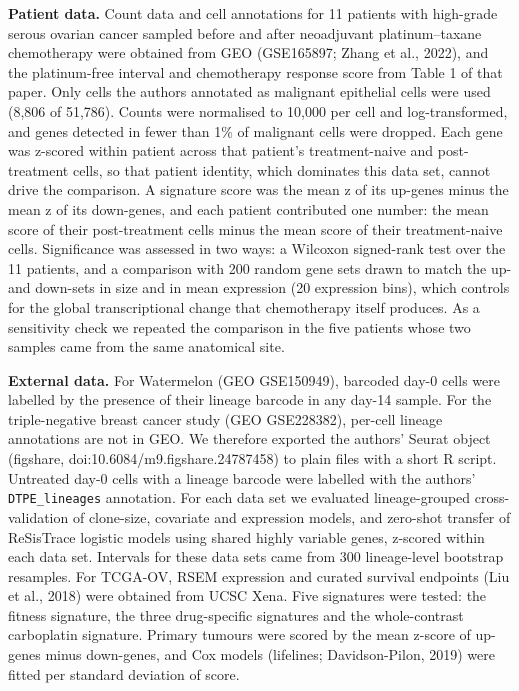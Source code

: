 \documentclass[11pt,a4paper]{article}
\begin{document}
\textbf{Patient data.} Count data and cell annotations for 11 patients with high-grade serous ovarian cancer sampled before and after neoadjuvant platinum--taxane chemotherapy were obtained from GEO (GSE165897; Zhang et al., 2022), and the platinum-free interval and chemotherapy response score from Table 1 of that paper. Only cells the authors annotated as malignant epithelial cells were used (8,806 of 51,786). Counts were normalised to 10,000 per cell and log-transformed, and genes detected in fewer than 1\% of malignant cells were dropped. Each gene was z-scored within patient across that patient's treatment-naive and post-treatment cells, so that patient identity, which dominates this data set, cannot drive the comparison. A signature score was the mean z of its up-genes minus the mean z of its down-genes, and each patient contributed one number: the mean score of their post-treatment cells minus the mean score of their treatment-naive cells. Significance was assessed in two ways: a Wilcoxon signed-rank test over the 11 patients, and a comparison with 200 random gene sets drawn to match the up- and down-sets in size and in mean expression (20 expression bins), which controls for the global transcriptional change that chemotherapy itself produces. As a sensitivity check we repeated the comparison in the five patients whose two samples came from the same anatomical site.

\textbf{External data.} For Watermelon (GEO GSE150949), barcoded day-0 cells were labelled by the presence of their lineage barcode in any day-14 sample. For the triple-negative breast cancer study (GEO GSE228382), per-cell lineage annotations are not in GEO. We therefore exported the authors' Seurat object (figshare, doi:10.6084/m9.figshare.24787458) to plain files with a short R script. Untreated day-0 cells with a lineage barcode were labelled with the authors' \texttt{DTPE\_lineages} annotation. For each data set we evaluated lineage-grouped cross-validation of clone-size, covariate and expression models, and zero-shot transfer of ReSisTrace logistic models using shared highly variable genes, z-scored within each data set. Intervals for these data sets came from 300 lineage-level bootstrap resamples. For TCGA-OV, RSEM expression and curated survival endpoints (Liu et al., 2018) were obtained from UCSC Xena. Five signatures were tested: the fitness signature, the three drug-specific signatures and the whole-contrast carboplatin signature. Primary tumours were scored by the mean z-score of up-genes minus down-genes, and Cox models (lifelines; Davidson-Pilon, 2019) were fitted per standard deviation of score.
\end{document}

